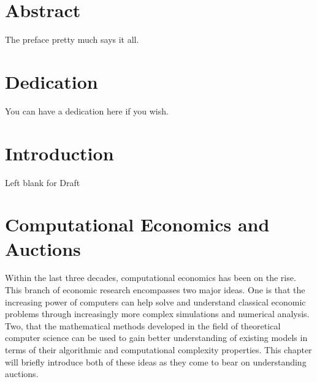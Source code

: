 \documentclass[12pt,twoside]{reedthesis}
\begin{document}
    \chapter*{Abstract}
	The preface pretty much says it all.
	
	\chapter*{Dedication}
	You can have a dedication here if you wish.

  \mainmatter %
  \pagestyle{fancyplain} %


    \chapter*{Introduction}

	
	Left blank for Draft

\chapter{Computational Economics and Auctions}
	Within the last three decades, computational economics has been on the rise. This branch of economic research encompasses two major ideas. One is that the increasing power of computers can help solve and understand classical economic problems through increasingly more complex simulations and numerical analysis. Two, that the mathematical methods developed in the field of theoretical computer science can be used to gain better understanding of existing models in terms of their algorithmic and computational complexity properties. This chapter will briefly introduce both of these ideas as they come to bear on understanding auctions.
\end{document}
